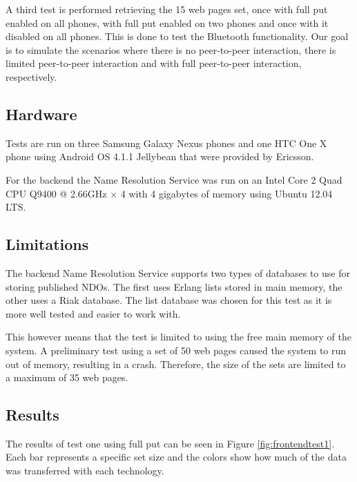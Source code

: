 A third test is performed retrieving the 15 web pages set, 
once with full put enabled on all phones, with full put enabled 
on two phones and once with it disabled on all phones. 
This is done to test the Bluetooth functionality. 
Our goal is to simulate the scenarios where there is no 
peer-to-peer interaction, there is limited peer-to-peer 
interaction and with full peer-to-peer interaction, respectively.

\subsection{Hardware}

Tests are run on three Samsung Galaxy Nexus phones and one 
HTC One X phone using Android OS 4.1.1 Jellybean that were 
provided by Ericsson.

For the backend the Name Resolution Service was run on an 
Intel Core 2 Quad CPU Q9400 @ 2.66GHz × 4 with 4 gigabytes 
of memory using Ubuntu 12.04 LTS.

\subsection{Limitations}

The backend Name Resolution Service supports two types of databases 
to use for storing published NDOs. The first uses Erlang 
lists stored in main memory, the other uses a Riak database. 
The list database was chosen for this test as it is more well 
tested and easier to work with.

This however means that the test is limited to using the free 
main memory of the system. A preliminary test using a set of 50 web 
pages caused the system to run out of memory, resulting in a crash. 
Therefore, the size of the sets are limited to a maximum of 35 web pages.

\subsection{Results}




The results of test one using full put can be seen in Figure \ref{fig:frontendtest1}. Each bar represents a 
specific set size and the colors show how much of the data was transferred with each technology.


